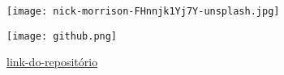 {
{\texttt{[image: nick-morrison-FHnnjk1Yj7Y-unsplash.jpg]}}
\begin{frame}[t]{} 
\end{frame}
}
\begin{frame}[c]{}
    \centering
    \texttt{[image: github.png]}
    
    \vspace*{0.3cm}
    \href{https://github.com/Brazilian-Institute-of-Robotics/bir-mini-method-bili}{link-do-repositório}
\end{frame}
